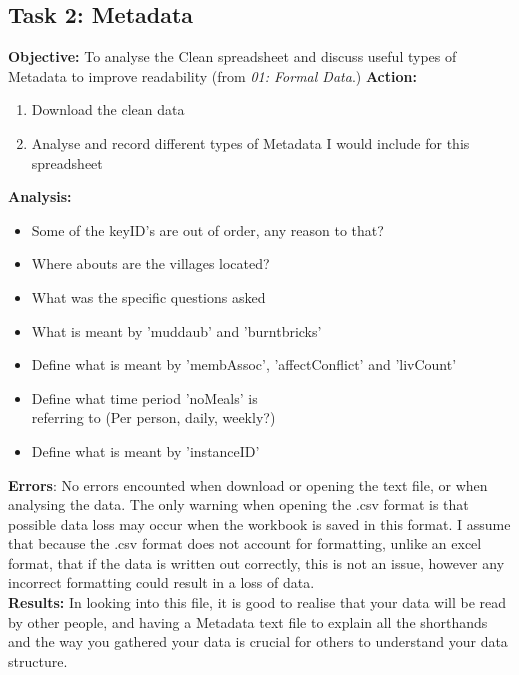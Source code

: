 \documentclass{article}
\begin{document}
\subsection{Task 2: Metadata}
%
\textbf{Objective:} To analyse the Clean spreadsheet and discuss useful types of Metadata to improve readability (from \textit{01: Formal Data}.)
\newline
\textbf{Action:}
\begin{enumerate}
    \item Download the clean data
    \item Analyse and record different types of Metadata I would include for this spreadsheet
\end{enumerate}
\textbf{Analysis:}
\begin{itemize}
    \item Some of the keyID's are out of order, any reason to that?
    \item Where abouts are the villages located?
    \item What was the specific questions asked
    \item What is meant by 'muddaub' and 'burntbricks'
    \item Define what is meant by 'membAssoc', 'affectConflict' and 'livCount'
    \item Define what time period 'noMeals' is \\ referring to (Per person, daily, weekly?)
    \item Define what is meant by 'instanceID'
\end{itemize}
\textbf{Errors}: No errors encounted when download or opening the text file, or when analysing the data. The only warning when opening the .csv format is that possible data loss may occur when the workbook is saved in this format. I assume that because the .csv format does not account for formatting, unlike an excel format, that if the data is written out correctly, this is not an issue, however any incorrect formatting could result in a loss of data.\\
\textbf{Results:} In looking into this file, it is good to realise that your data will be read by other people, and having a Metadata text file to explain all the shorthands and the way you gathered your data is crucial for others to understand your data structure. 
\newpage
\end{document}
